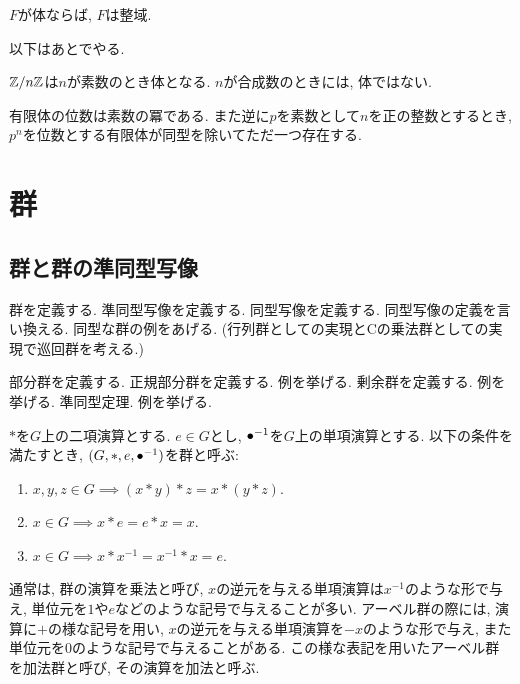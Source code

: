 \begin{prop}
  $F$が体ならば, $F$は整域.
\end{prop}


以下はあとでやる.
\begin{prop}
  $\mathbb{Z}/n\mathbb{Z}$は$n$が素数のとき体となる.
  $n$が合成数のときには, 体ではない.
\end{prop}

\begin{prop}
  有限体の位数は素数の冪である.
  また逆に$p$を素数として$n$を正の整数とするとき,
  $p^n$を位数とする有限体が同型を除いてただ一つ存在する.
\end{prop}

\chapter{群}
\section{群と群の準同型写像}
 群を定義する.
 準同型写像を定義する.
 同型写像を定義する.
 同型写像の定義を言い換える.
 同型な群の例をあげる.
 (行列群としての実現とCの乗法群としての実現で巡回群を考える.)
 
 部分群を定義する.
 正規部分群を定義する.
 例を挙げる.
 剰余群を定義する.
 例を挙げる.
 準同型定理.
 例を挙げる.

\begin{definition}[再掲]
  $\ast$を$G$上の二項演算とする.
  $e\in G$とし,
  ${\bullet}^{-1}$を$G$上の単項演算とする.
  以下の条件を満たすとき,
  $(G,\ast,e,{\bullet}^{-1})$を群と呼ぶ:
  \begin{enumerate}
  \item $x,y,z\in G\implies (x\ast y) \ast z = x\ast (y\ast z)$.
  \item $x\in G\implies x\ast e=e\ast x =x$.
  \item $x\in G \implies x\ast x^{-1}=x^{-1}\ast x =e$.
  \end{enumerate}
\end{definition}
\begin{remark}
  通常は,
  群の演算を乗法と呼び,
  $x$の逆元を与える単項演算は$x^{-1}$のような形で与え,
  単位元を$1$や$e$などのような記号で与えることが多い.
  アーベル群の際には,
  演算に$+$の様な記号を用い,
  $x$の逆元を与える単項演算を$-x$のような形で与え,
  また単位元を$0$のような記号で与えることがある.
  この様な表記を用いたアーベル群を加法群と呼び,
  その演算を加法と呼ぶ.
\end{remark}

